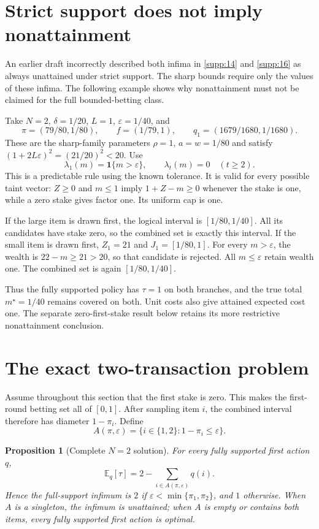 \documentclass[11pt]{article}
\newtheorem{proposition}{Proposition}
\newcommand{\E}{\mathbb{E}}
\begin{document}
\section{Strict support does not imply nonattainment}
An earlier draft incorrectly described both infima in \eqref{supp:14} and \eqref{supp:16} as always
unattained under strict support. The sharp bounds require only the values of
these infima. The following example shows why nonattainment must not be
claimed for the full bounded-betting class.

Take $N=2$, $\delta=1/20$, $L=1$, $\varepsilon=1/40$, and
\[
\pi=(79/80,1/80),\qquad f=(1/79,1),\qquad
q_1=(1679/1680,1/1680).
\]
These are the sharp-family parameters $\rho=1$, $a=w=1/80$ and satisfy
$(1+2L\varepsilon)^2=(21/20)^2<20$. Use
\[
\lambda_1(m)=\mathbf1\{m>\varepsilon\},\qquad
\lambda_t(m)=0\quad(t\ge2).
\]
This is a predictable rule using the known tolerance. It is valid for every
possible taint vector: $Z\ge0$ and $m\le1$ imply $1+Z-m\ge0$ whenever the
stake is one, while a zero stake gives factor one. Its uniform cap is one.

If the large item is drawn first, the logical interval is
$[1/80,1/40]$. All its candidates have stake zero, so the combined set is
exactly this interval. If the small item is drawn first, $Z_1=21$ and
$J_1=[1/80,1]$. For every $m>\varepsilon$, the wealth is
$22-m\ge21>20$, so that candidate is rejected. All $m\le\varepsilon$
retain wealth one. The combined set is again $[1/80,1/40]$.

Thus the fully supported policy has $\tau=1$ on both branches, and the true
total $m^\star=1/40$ remains covered on both. Unit costs also give attained
expected cost one. The separate zero-first-stake result below retains its
more restrictive nonattainment conclusion.
\section{The exact two-transaction problem}

Assume throughout this section that the first stake is zero. This makes the first-round betting set all of \([0,1]\). After
sampling item \(i\), the combined interval therefore has diameter
\(1-\pi_i\). Define
\[
 A(\pi,\varepsilon)=\{i\in\{1,2\}:1-\pi_i\le\varepsilon\}.
\]

\begin{proposition}[Complete \(N=2\) solution]
For every fully supported first action \(q\),
\begin{equation}\label{supp:6}
\E_q[\tau]=2-\sum_{i\in A(\pi,\varepsilon)}q(i).
\end{equation}
Hence the full-support infimum is \(2\) if
\(\varepsilon<\min\{\pi_1,\pi_2\}\), and \(1\) otherwise.
When \(A\) is a singleton, the infimum is unattained; when \(A\) is empty
or contains both items, every fully supported first action is optimal.
\end{proposition}
\end{document}
